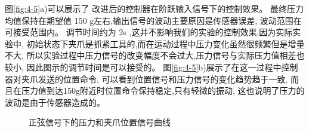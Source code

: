 图\ref{fig:4-5}a)可以展示了 改进后的控制器在阶跃输入信号下的控制效果。
最终压力均值保持在期望值 150 g左右,输出信号的波动主要原因是传感器误差,
波动范围在可接受范围内。
调节时间约为 2s ,这并不影响我们的实验的控制效果,因为实际实验中,
初始状态下夹爪是抓紧工具的,而在运动过程中压力变化虽然很频繁但是增量不大,
所以实验过程中压力信号的改变幅度不会过大,压力信号与实际压力值相差也较小,
因此图示的调节时间是可以接受的。
图\ref{fig:4-5}b)展示了在这一过程中控制器对夹爪发送的位置命令,
可以看到位置信号和压力信号的变化趋势趋于一致,
而且在压力值到达150g附近时位置命令保持稳定,只有轻微的振动,
这也说明了压力的波动是由于传感器造成的。



\begin{figure}[!h]
  \centering
    \hspace{0pt}
  \caption{\label{fig:4-6}正弦信号下的压力和夹爪位置信号曲线}
  \vspace{-0.3cm}
\end{figure}



